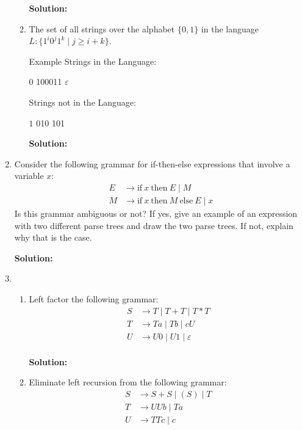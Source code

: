 \documentclass[11pt]{article}
\newcommand\tab[1][1cm]{\hspace*{#1}}
\let\epsilon\varepsilon
\begin{document}
\begin{enumerate}
\begin{enumerate}
    \textbf{Solution:}
    
   
  \item The set of all strings over the alphabet $\{0, 1\}$ in the language $L : \{ 1^i 0^j 1^k \mid j \ge i + k \}$.

    Example Strings in the Language:
    \begin{center}
      $0$ \tab \tab 100011 \tab \tab $\epsilon$
    \end{center}
    Strings not in the Language: 
    \begin{center}
      $1$ \tab \tab 010 \tab \tab 101
    \end{center}

    \textbf{Solution:}
    
  \end{enumerate}
    
  \newpage

\item Consider the following grammar for if-then-else expressions that involve a variable $x$:
  \begin{align*}
    E &\to \text{if} \ x \ \text{then} \ E \mid \mathit{M} \\
    \mathit{M} &\to \text{if} \ x \ \text{then} \ \mathit{M} \ \text{else} \ E \mid x
  \end{align*}
  Is this grammar ambiguous or not?
  If yes, give an example of an expression with two different parse trees and draw the two parse trees.
  If not, explain why that is the case.

  \textbf{Solution:}

  \newpage

\item
  \begin{enumerate}
    
  \item Left factor the following grammar:
    \begin{equation*}
      \begin{split}
        S &\to T \mid T + T \mid T * T \\
        T &\to Ta \mid Tb \mid cU \\
        U &\to U0 \mid U1 \mid \epsilon \\
      \end{split}
    \end{equation*}

    \textbf{Solution:}

  \item Eliminate left recursion from the following grammar:
    \begin{equation*}
      \begin{split}
        S &\to S + S \mid (S) \mid T \\
        T &\to U U b \mid T a \\
        U &\to T T c \mid c
      \end{split}
    \end{equation*}


\end{enumerate}
\end{enumerate}
\end{document}
